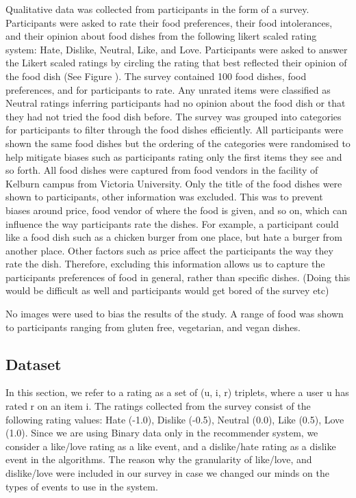 Qualitative data was collected from participants in the form of a survey. Participants were asked to rate their food preferences, their food intolerances, and their opinion about food dishes from the following likert scaled rating system: Hate, Dislike, Neutral, Like, and Love. Participants were asked to answer the Likert scaled ratings by circling the rating that best reflected their opinion of the food dish (See Figure ). The survey contained 100 food dishes,  food preferences, and  for participants to rate. Any unrated items were classified as Neutral ratings inferring participants had no opinion about the food dish or that they had not tried the food dish before. The survey was grouped into categories for participants to filter through the food dishes efficiently. All participants were shown the same food dishes but the ordering of the categories were randomised to help mitigate biases such as participants rating only the first items they see and so forth. All food dishes were captured from food vendors in the facility of Kelburn campus from Victoria University. Only the title of the food dishes were shown to participants, other information was excluded. This was to prevent biases around price, food vendor of where the food is given, and so on, which can influence the way participants rate the dishes. For example, a participant could like a food dish such as a chicken burger from one place, but hate a burger from another place. Other factors such as price affect the participants the way they rate the dish. Therefore, excluding this information allows us to capture the participants preferences of food in general, rather than specific dishes.  (Doing this would be difficult as well and participants would get bored of the survey etc)

No images were used to bias the results of the study. 
A range of food was shown to participants ranging from gluten free, vegetarian, and vegan dishes. 

\subsection{Dataset}
In this section, we refer to a rating as a set of (u, i, r) triplets, where a user u has rated r on an item i. 
The ratings collected from the survey consist of the following rating values: Hate (-1.0), Dislike (-0.5), Neutral (0.0), Like (0.5), Love (1.0). Since we are using Binary data only in the recommender system, we consider a like/love rating as a like event, and a dislike/hate rating as a dislike event in the algorithms. The reason why the granularity of like/love, and dislike/love were included in our survey in case we changed our minds on the types of events to use in the system.

